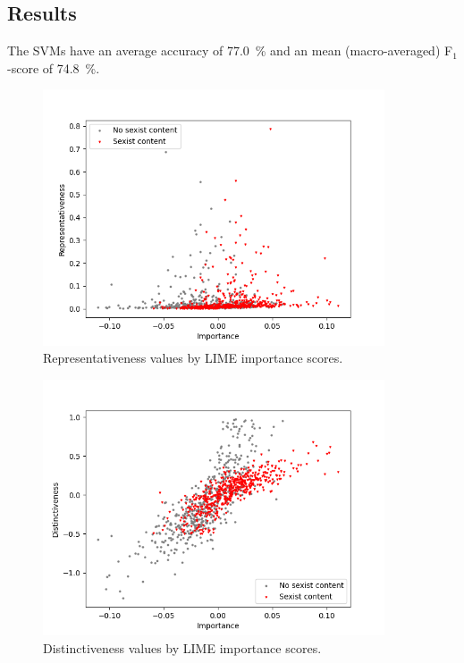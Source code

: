 \subsection{Results}
\label{sec:tweets-svm-results}

The SVMs have an average accuracy of 77.0~\% and an mean (macro-averaged) F$_1$-score of 74.8~\%.

\begin{figure}[htbp]
    \centering
    \includegraphics[width=0.9\textwidth]{figures/4-tweets/importance-rep-all-mean-unscaled.png}
    \caption[Representativeness values by LIME importance scores for features in the Twitter data]{Representativeness values by LIME importance scores.}
    \label{fig:tweets-rep}
\end{figure}
\begin{figure}[htbp]
    \centering
    \includegraphics[width=0.9\textwidth]{figures/4-tweets/importance-dist-all-mean-unscaled.png}
    \caption[Distinctiveness values by LIME importance scores for features in the Twitter data]{Distinctiveness values by LIME importance scores.}
    \label{fig:tweets-dist}
\end{figure}

